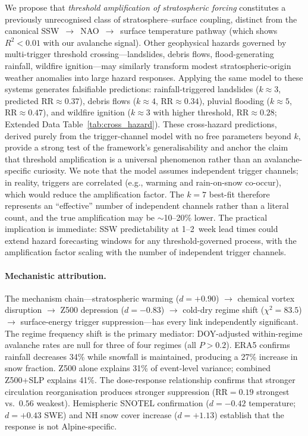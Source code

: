 \documentclass[11pt,letterpaper]{article}
\begin{document}
We propose that \emph{threshold amplification of stratospheric forcing} constitutes a previously unrecognised class of stratosphere--surface coupling, distinct from the canonical SSW~$\to$~NAO~$\to$~surface temperature pathway (which shows $R^2 < 0.01$ with our avalanche signal). Other geophysical hazards governed by multi-trigger threshold crossing---landslides, debris flows, flood-generating rainfall, wildfire ignition---may similarly transform modest stratospheric-origin weather anomalies into large hazard responses. Applying the same model to these systems generates falsifiable predictions: rainfall-triggered landslides ($k \approx 3$, predicted $\mathrm{RR} \approx 0.37$), debris flows ($k \approx 4$, $\mathrm{RR} \approx 0.34$), pluvial flooding ($k \approx 5$, $\mathrm{RR} \approx 0.47$), and wildfire ignition ($k \approx 3$ with higher threshold, $\mathrm{RR} \approx 0.28$; Extended Data Table~\ref{tab:cross_hazard}). These cross-hazard predictions, derived purely from the trigger-channel model with no free parameters beyond $k$, provide a strong test of the framework's generalisability and anchor the claim that threshold amplification is a universal phenomenon rather than an avalanche-specific curiosity. We note that the model assumes independent trigger channels; in reality, triggers are correlated (e.g., warming and rain-on-snow co-occur), which would reduce the amplification factor. The $k = 7$ best-fit therefore represents an ``effective'' number of independent channels rather than a literal count, and the true amplification may be $\sim$10--20\% lower. The practical implication is immediate: SSW predictability at 1--2~week lead times\cite{Sigmond2013} could extend hazard forecasting windows for any threshold-governed process, with the amplification factor scaling with the number of independent trigger channels.

\paragraph{Mechanistic attribution.} The mechanism chain---stratospheric warming ($d = +0.90$) $\to$ chemical vortex disruption $\to$ Z500 depression ($d = -0.83$) $\to$ cold-dry regime shift ($\chi^2 = 83.5$) $\to$ surface-energy trigger suppression---has every link independently significant. The regime frequency shift is the primary mediator: DOY-adjusted within-regime avalanche rates are null for three of four regimes (all $P > 0.2$). ERA5 confirms rainfall decreases 34\% while snowfall is maintained, producing a 27\% increase in snow fraction. Z500 alone explains 31\% of event-level variance; combined Z500+SLP explains 41\%. The dose-response relationship confirms that stronger circulation reorganisation produces stronger suppression ($\mathrm{RR} = 0.19$ strongest vs.\ $0.56$ weakest). Hemispheric SNOTEL confirmation ($d = -0.42$ temperature; $d = +0.43$ SWE) and NH snow cover increase ($d = +1.13$) establish that the response is not Alpine-specific.
\end{document}
